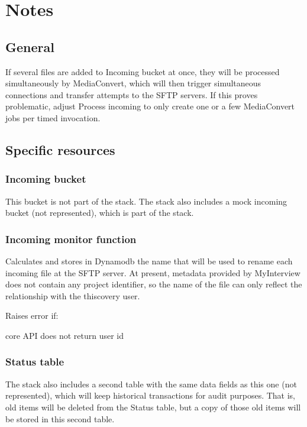 \documentclass{article}
\begin{document}
\section*{Notes}

\subsection*{General}
If several files are added to Incoming bucket at once, they will be processed simultaneously by MediaConvert, which will then trigger simultaneous connections and transfer attempts to the SFTP servers. If this proves problematic, adjust Process incoming to only create one or a few MediaConvert jobs per timed invocation.

\subsection*{Specific resources}
\subsubsection*{Incoming bucket}
This bucket is not part of the stack. The stack also includes a mock incoming bucket (not represented), which is part of the stack.
\subsubsection*{Incoming monitor function}
Calculates and stores in Dynamodb the name that will be used to rename each incoming file at the SFTP server. At present, metadata provided by MyInterview does not contain any project identifier, so the name of the file can only reflect the relationship with the thiscovery user.

Raises error if:
\begin{compactenum}
\item core API does not return user id
\end{compactenum}


\subsubsection*{Status table}
The stack also includes a second table with the same data fields as this one (not represented), which will keep historical transactions for audit purposes. That is, old items will be deleted from the Status table, but a copy of those old items will be stored in this second table.
\end{document}
